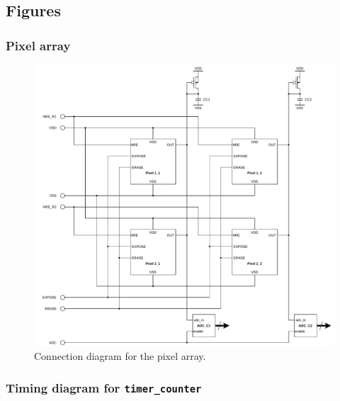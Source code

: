 \subsection{Figures}

\subsubsection{Pixel array}
\label{fig:app:pixelarray}
\begin{figure}[!htbp]
    \centering
    \includegraphics[width=\textwidth]{Images/Block_diagrams/pixel_array.pdf}
    \caption{Connection diagram for the pixel array.}
    \label{fig:app:fig:pixelarray}
\end{figure}

\clearpage
\subsubsection{Timing diagram for \texttt{timer\_counter}}\label{app:figs:timer_counter}
\begin{figure}[!htbp]
    \centering
\end{figure}


